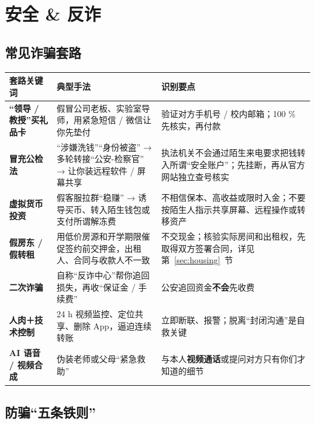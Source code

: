 \section{安全 \& 反诈}\label{sec:safety_fraud}


\subsection{常见诈骗套路}
\noindent
\scriptsize
{}
\begin{tabularx}{\textwidth}{p{} p{} X}
  \toprule
  \textbf{套路关键词} & \textbf{典型手法} & \textbf{识别要点} \\
  \midrule
  \textbf{“领导 / 教授”买礼品卡} & 假冒公司老板、实验室导师，用紧急短信 / 微信让你先垫付 & 验证对方手机号 / 校内邮箱；100 \% 先核实，再付款 \\
  \textbf{冒充公检法} & “涉嫌洗钱”“身份被盗” → 多轮转接“公安-检察官” → 让你装远程软件 / 屏幕共享 & 执法机关不会通过陌生来电要求把钱转入所谓“安全账户”；先挂断，再从官方网站独立查号核实 \\
  \textbf{虚拟货币投资} & 假客服拉群“稳赚” → 诱导买币、转入陌生钱包或支付所谓解冻费 & 不相信保本、高收益或限时入金；不要按陌生人指示共享屏幕、远程操作或转移资产 \\
  \textbf{假房东 / 假转租} & 用低价房源和开学期限催促签约前交押金，出租人、合同与收款人不一致 & 不交现金；核验实际房间和出租权，先取得双方签署合同，详见第~\ref{sec:housing}~节 \\
  \textbf{二次诈骗} & 自称“反诈中心”帮你追回损失，再收“保证金 / 手续费” & 公安追回资金\textbf{不会}先收费 \\
  \textbf{人肉＋技术控制} & 24 h 视频监控、定位共享、删除 App，逼迫连续转账 & 立即断联、报警；脱离“封闭沟通”是自救关键 \\
  \textbf{AI 语音 / 视频合成} & 伪装老师或父母“紧急救助” & 与本人\textbf{视频通话}或提问对方只有你们才知道的细节 \\
  \bottomrule
\end{tabularx}
\normalsize

\subsection{防骗“五条铁则”}

